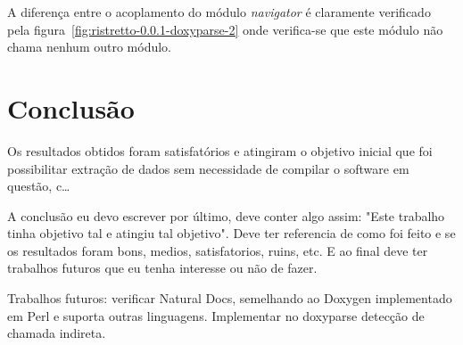 A diferença entre o acoplamento do módulo {\it navigator} é claramente
verificado pela figura~\ref{fig:ristretto-0.0.1-doxyparse-2} onde verifica-se que
este módulo não chama nenhum outro módulo.

\chapter{Conclusão} \label{ch:conclusao}

Os resultados obtidos foram satisfatórios e atingiram o objetivo inicial que
foi possibilitar extração de dados sem necessidade de compilar o software em
questão, c\ldots

A conclusão eu devo escrever por último, deve conter algo assim: "Este trabalho
tinha objetivo tal e atingiu tal objetivo". Deve ter referencia de como foi
feito e se os resultados foram bons, medios, satisfatorios, ruins, etc. E ao
final deve ter trabalhos futuros que eu tenha interesse ou não de fazer.

Trabalhos futuros: verificar Natural Docs, semelhando ao Doxygen implementado
em Perl e suporta outras linguagens. Implementar no doxyparse detecção de chamada
indireta.
